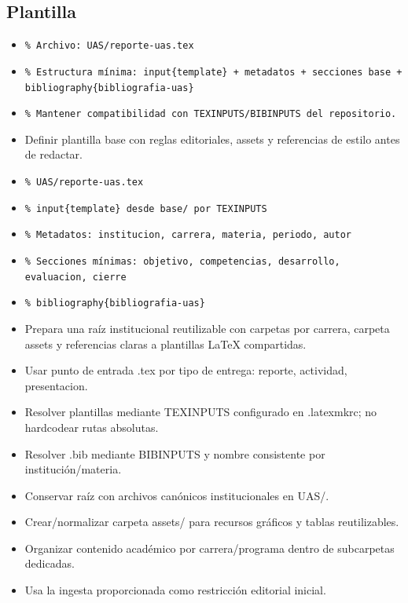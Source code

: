 \documentclass[12pt]{article}
\begin{document}
\subsection*{Plantilla}
\begin{itemize}[leftmargin=*]
  \item \texttt{\% Archivo: UAS/reporte-uas.tex}
  \item \texttt{\% Estructura mínima: input\{template\} + metadatos + secciones base + bibliography\{bibliografia-uas\}}
  \item \texttt{\% Mantener compatibilidad con TEXINPUTS/BIBINPUTS del repositorio.}
  \item Definir plantilla base con reglas editoriales, assets y referencias de estilo antes de redactar.
  \item \texttt{\% UAS/reporte-uas.tex}
  \item \texttt{\% input\{template\} desde base/ por TEXINPUTS}
  \item \texttt{\% Metadatos: institucion, carrera, materia, periodo, autor}
  \item \texttt{\% Secciones mínimas: objetivo, competencias, desarrollo, evaluacion, cierre}
  \item \texttt{\% bibliography\{bibliografia-uas\}}
  \item Prepara una raíz institucional reutilizable con carpetas por carrera, carpeta assets y referencias claras a plantillas LaTeX compartidas.
  \item Usar punto de entrada .tex por tipo de entrega: reporte, actividad, presentacion.
  \item Resolver plantillas mediante TEXINPUTS configurado en .latexmkrc; no hardcodear rutas absolutas.
  \item Resolver .bib mediante BIBINPUTS y nombre consistente por institución/materia.
  \item Conservar raíz con archivos canónicos institucionales en UAS/.
  \item Crear/normalizar carpeta assets/ para recursos gráficos y tablas reutilizables.
  \item Organizar contenido académico por carrera/programa dentro de subcarpetas dedicadas.
  \item Usa la ingesta proporcionada como restricción editorial inicial.
\end{itemize}
\end{document}
